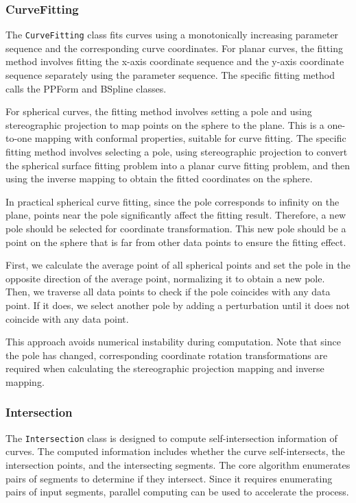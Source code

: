 \documentclass[a4paper]{article}
\begin{document}
\begin{sloppypar}
\subsubsection{CurveFitting}
The \verb|CurveFitting| class fits curves using a monotonically increasing
parameter sequence and the corresponding curve coordinates. For planar curves,
the fitting method involves fitting the x-axis coordinate sequence and the
y-axis coordinate sequence separately using the parameter sequence. The
specific fitting method calls the PPForm and BSpline classes.

For spherical curves, the fitting method involves setting a pole and using
stereographic projection to map points on the sphere to the plane. This is a
one-to-one mapping with conformal properties, suitable for curve fitting. The
specific fitting method involves selecting a pole, using stereographic
projection to convert the spherical surface fitting problem into a planar curve
fitting problem, and then using the inverse mapping to obtain the fitted
coordinates on the sphere.

In practical spherical curve fitting, since the pole corresponds to infinity on
the plane, points near the pole significantly affect the fitting result.
Therefore, a new pole should be selected for coordinate transformation. This
new pole should be a point on the sphere that is far from other data points to
ensure the fitting effect.

First, we calculate the average point of all spherical points and set the pole
in the opposite direction of the average point, normalizing it to obtain a new
pole. Then, we traverse all data points to check if the pole coincides with any
data point. If it does, we select another pole by adding a perturbation until
it does not coincide with any data point.

This approach avoids numerical instability during computation. Note that since
the pole has changed, corresponding coordinate rotation transformations are
required when calculating the stereographic projection mapping and inverse
mapping.

\subsubsection{Intersection}
The \verb|Intersection| class is designed to compute self-intersection
information of curves. The computed information includes whether the curve
self-intersects, the intersection points, and the intersecting segments. The core algorithm enumerates pairs of segments to determine if they intersect. Since it requires enumerating pairs of input segments, parallel computing can be used to accelerate the process.


\end{sloppypar}
\end{document}
